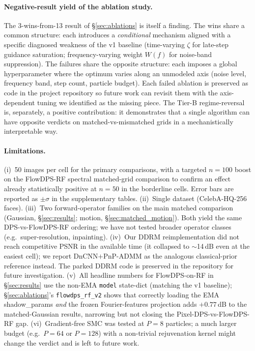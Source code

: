 \documentclass{article}
\begin{document}
\paragraph{Negative-result yield of the ablation study.}
The 3-wins-from-13 result of \S\ref{sec:ablations} is itself a
finding. The wins share a common structure: each introduces a
\emph{conditional} mechanism aligned with a specific diagnosed
weakness of the v1 baseline (time-varying $\zeta$ for late-step
guidance saturation; frequency-varying weight $W(f)$ for noise-band
suppression). The failures share the opposite structure: each
imposes a global hyperparameter where the optimum varies along an
unmodeled axis (noise level, frequency band, step count, particle
budget). Each failed ablation is preserved as code in the project
repository so future work can revisit them with the
axis-dependent tuning we identified as the missing piece. The
Tier-B regime-reversal is, separately, a positive contribution: it
demonstrates that a single algorithm can have opposite verdicts on
matched-vs-mismatched grids in a mechanistically interpretable way.

\paragraph{Limitations.}
(i)~50 images per cell for the primary comparisons, with a targeted
$n{=}100$ boost on the FlowDPS-RF spectral matched-grid comparison to
confirm an effect already statistically positive at $n{=}50$ in the
borderline cells. Error bars are reported as $\pm\sigma$ in the
supplementary tables. (ii)~Single dataset (CelebA-HQ-256 faces).
(iii)~Two forward-operator families on the main matched comparison
(Gaussian, \S\ref{sec:results}; motion, \S\ref{sec:matched_motion}).
Both yield the same DPS-vs-FlowDPS-RF ordering; we have not tested
broader operator classes (e.g.\ super-resolution, inpainting).
(iv)~Our DDRM reimplementation did not reach competitive PSNR in the
available time (it collapsed to $\sim$14\,dB even at the easiest cell);
we report DnCNN$+$PnP-ADMM as the analogous classical-prior reference
instead. The parked DDRM code is preserved in the repository for future
investigation. (v)~All headline numbers for FlowDPS-on-RF in
\S\ref{sec:results} use the non-EMA \texttt{model} state-dict (matching
the v1 baseline); \S\ref{sec:ablations}'s \texttt{flowdps\_rf\_v2}
shows that correctly loading the EMA shadow\_params \emph{and} the
frozen Fourier-features projection adds $+0.77$\,dB to the
matched-Gaussian results, narrowing but not closing the
Pixel-DPS-vs-FlowDPS-RF gap. (vi)~Gradient-free SMC was tested at
$P{=}8$ particles; a much larger budget (e.g.\ $P{=}64$ or $P{=}128$)
with a non-trivial rejuvenation kernel might change the verdict and
is left to future work.
\end{document}
